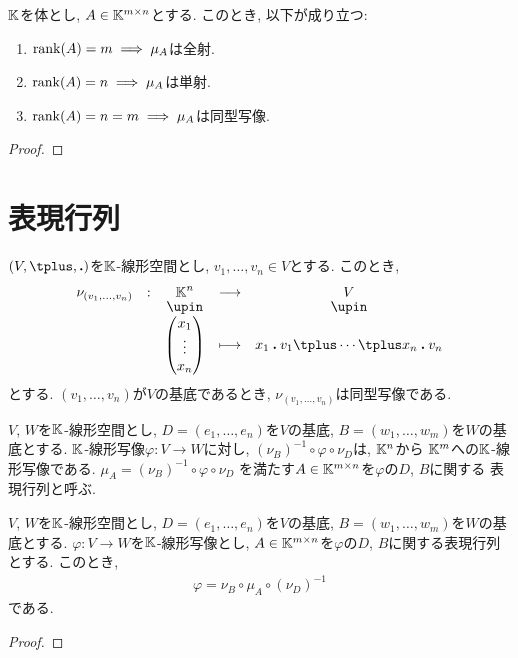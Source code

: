 \begin{cor}
  $\mathbb{K}$を体とし,
  $A\in\mathbb{K}^{m\times n}$とする.
  このとき,
  以下が成り立つ:
  \begin{enumerate}
  \item $\operatorname{rank}(A)=m \implies \mu_A$は全射.
  \item $\operatorname{rank}(A)=n \implies \mu_A$は単射.
  \item $\operatorname{rank}(A)=n=m\implies \mu_A$は同型写像.
  \end{enumerate}
\end{cor}
\begin{proof}\end{proof}



\section{表現行列}
$(V,\plus,\act)$を$\mathbb{K}$-線形空間とし, $v_1,\ldots,v_n\in V$とする.
このとき,
\begin{align*}
    \shazo{\nu_{(v_1,\ldots,v_n)}}{\KK^n}{V}
          {\begin{pmatrix}x_1\\\vdots\\x_n\end{pmatrix}}
          {x_1\act v_1\plus \cdots\plus x_n\act v_n}
\end{align*}
とする.
$(v_1,\ldots,v_n)$が$V$の基底であるとき,
$\nu_{(v_1,\ldots,v_n)}$は同型写像である.

\begin{definition}
  $V$, $W$を$\mathbb{K}$-線形空間とし,
  $D=(e_1,\ldots,e_n)$を$V$の基底,
  $B=(w_1,\ldots,w_m)$を$W$の基底とする.
  $\mathbb{K}$-線形写像$\varphi\colon V\to W$に対し,
  $(\nu_B)^{-1}\circ \varphi\circ \nu_D$は,
  $\mathbb{K}^n$から $\mathbb{K}^m$への$\mathbb{K}$-線形写像である.
  $\mu_A=(\nu_B)^{-1}\circ \varphi\circ \nu_D$
  を満たす$A\in\mathbb{K}^{m\times n}$を$\varphi$の$D$, $B$に関する
  表現行列と呼ぶ.
\end{definition}
\begin{prop}
  $V$, $W$を$\mathbb{K}$-線形空間とし,
  $D=(e_1,\ldots,e_n)$を$V$の基底,
  $B=(w_1,\ldots,w_m)$を$W$の基底とする.
  $\varphi\colon V\to W$を$\mathbb{K}$-線形写像とし,
  $A\in\mathbb{K}^{m\times n}$を$\varphi$の$D$, $B$に関する表現行列とする.
このとき,
\begin{align*}
  \varphi=\nu_B\circ \mu_A\circ (\nu_{D})^{-1}
\end{align*}
である.
\end{prop}
\begin{proof}\end{proof}


